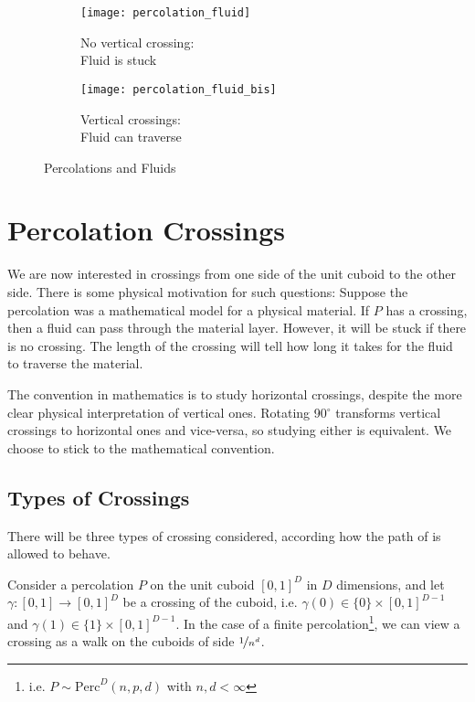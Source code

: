 \begin{wrapfigure}{r}{8.7cm}
	\vspace{-0.75cm}
	\begin{subfigure}{4.3cm}
		\texttt{[image: percolation\_fluid]}
		\centering
		\captionsetup{justification=centering}
		\caption{No vertical crossing: \\Fluid is stuck}
		\label{fig:percolationFluidNoCrossing}
	\end{subfigure}
	\begin{subfigure}{4.2cm}
		\texttt{[image: percolation\_fluid\_bis]}
		\centering
		\captionsetup{justification=centering}
		\caption{Vertical crossings: \\Fluid can traverse}
		\label{fig:percolationFluidCrossing}
	\end{subfigure}
	\centering
	\caption{Percolations and Fluids}
	\label{fig:percolationFluid}
\end{wrapfigure}
\section{Percolation Crossings}
We are now interested in crossings from one side of the unit cuboid to the other side.
There is some physical motivation for such questions:
Suppose the percolation was a mathematical model for a physical material.
If $P$ has a crossing, then a fluid can pass through the material layer.
However, it will be stuck if there is no crossing.
The length of the crossing will tell how long it takes for the fluid to traverse the material.

The convention in mathematics is to study horizontal crossings, despite the more clear physical interpretation of vertical ones.
Rotating 90$^{\circ}$ transforms vertical crossings to horizontal ones and vice-versa, so studying either is equivalent.
We choose to stick to the mathematical convention.

\subsection{Types of Crossings}
There will be three types of crossing considered, according how the path of is allowed to behave.

Consider a percolation $P$ on the unit cuboid $\left[ 0,1 \right]^D$ in $D$ dimensions, and let $\gamma: \left[ 0,1 \right] \to \left[ 0,1 \right]^D$ be a crossing of the cuboid, i.e. $\gamma(0) \in \{ 0 \} \times \left[ 0,1 \right]^{D-1}$ and $\gamma(1) \in \{ 1 \} \times \left[ 0,1 \right]^{D-1}$.
In the case of a finite percolation\footnote{i.e. $P \sim \text{Perc}^D(n,p,d)$ with $n,d < \infty$}, we can view a crossing as a walk on the cuboids of side $\nicefrac{1}{n^d}$.

